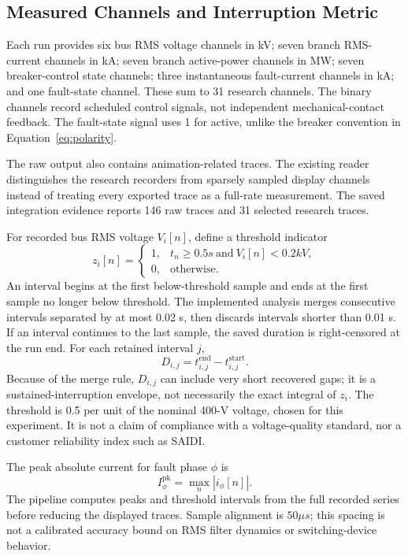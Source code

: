 \subsection{Measured Channels and Interruption Metric}
Each run provides six bus RMS voltage channels in kV; seven branch RMS-current
channels in kA; seven branch active-power channels in MW; seven breaker-control
state channels; three instantaneous fault-current channels in kA; and one
fault-state channel. These sum to 31 research channels. The binary
 channels record scheduled control signals, not independent
mechanical-contact feedback. The fault-state signal uses 1 for active,
unlike the breaker convention in Equation~\ref{eq:polarity}.

The raw output also contains animation-related traces. The existing reader
distinguishes the research recorders from sparsely sampled display channels
instead of treating every exported trace as a full-rate measurement. The saved
integration evidence reports 146 raw traces and 31 selected research traces.

For recorded bus RMS voltage $V_i[n]$, define a threshold indicator
\begin{equation}
 z_i[n]=\begin{cases}
 1,& t_n\geq 0.5\unit{s}\ \text{and}\ V_i[n]<0.2\unit{kV},\\
 0,&\text{otherwise}.
 \end{cases}
\end{equation}
An interval begins at the first below-threshold sample and ends at the first
sample no longer below threshold. The implemented analysis merges consecutive
intervals separated by at most 0.02 s, then discards intervals shorter than
0.01 s. If an interval continues to the last sample, the saved duration is
right-censored at the run end. For each retained interval $j$,
\begin{equation}
 D_{i,j}=t_{i,j}^{\mathrm{end}}-t_{i,j}^{\mathrm{start}}.
\end{equation}
Because of the merge rule, $D_{i,j}$ can include very short recovered gaps;
it is a sustained-interruption envelope, not necessarily the exact integral of
$z_i$. The threshold is 0.5 per unit of the nominal 400-V voltage, chosen for
this experiment. It is not a claim of compliance with a voltage-quality
standard, nor a customer reliability index such as SAIDI.

The peak absolute current for fault phase $\phi$ is
\begin{equation}
 I_{\phi}^{\mathrm{pk}}=\max_n |i_{\phi}[n]|.
\end{equation}
The pipeline computes peaks and threshold intervals from the full recorded
series before reducing the displayed traces. Sample alignment is
$50\unit{\mu s}$; this spacing is not a calibrated accuracy bound on RMS
filter dynamics or switching-device behavior.

